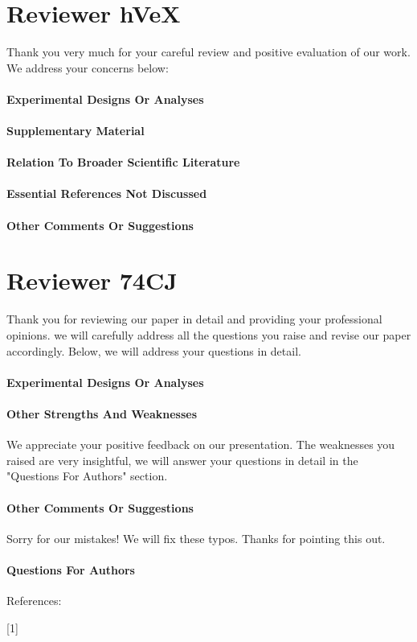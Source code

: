 \documentclass{article}
\begin{document}
\section{Reviewer hVeX}
Thank you very much for your careful review and positive evaluation of our work. We address your concerns below:
\paragraph{Experimental Designs Or Analyses}
\paragraph{Supplementary Material}
\paragraph{Relation To Broader Scientific Literature}
\paragraph{Essential References Not Discussed}
\paragraph{Other Comments Or Suggestions}
\section{Reviewer 74CJ}
Thank you for reviewing our paper in detail and providing your professional opinions. we will carefully address all the questions you raise and revise our paper accordingly. Below, we will address your questions in detail.
\paragraph{Experimental Designs Or Analyses}
\paragraph{Other Strengths And Weaknesses}
We appreciate your positive feedback on our presentation. The weaknesses you raised are very insightful, we will answer your questions in detail in the "Questions For Authors" section.
\paragraph{Other Comments Or Suggestions}
Sorry for our mistakes! We will fix these typos. Thanks for pointing this out.
\paragraph{Questions For Authors}

\newpage
References:

[1] 

% 
% 
\end{document}
